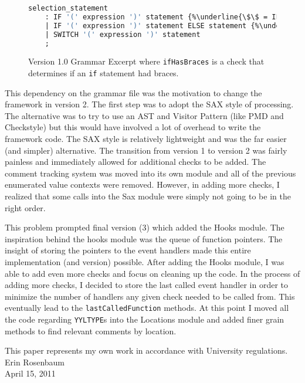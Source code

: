 \documentclass[12pt]{report}
\begin{document}
\begin{figure}
\begin{lstlisting}[language=Caml, escapechar=\%]
selection_statement
	: IF '(' expression ')' statement {%\underline{\$\$ = IF\_SELECTION;}% ifHasBraces($5, @$);}
	| IF '(' expression ')' statement ELSE statement {%\underline{\$\$ = IF\_ELSE\_SELECTION;}% ifHasBraces($5, @$); ifHasBraces($7, @$);}
	| SWITCH '(' expression ')' statement
	;
\end{lstlisting}
\caption[Version 1.0 Grammar Excerpt]{Version 1.0 Grammar Excerpt where \lstinline{ifHasBraces} is a check that determines if an \lstinline{if} statement had braces.}
\label{1.0grammar}
\end{figure}

This dependency on the grammar file was the motivation to change the framework in version 2. The first 
step was to adopt the SAX style of processing. The alternative was to try to use an AST and Visitor 
Pattern (like PMD and Checkstyle) but this would have involved a lot of overhead to write the framework 
code. The SAX style is relatively lightweight and was the far easier (and simpler) alternative. The 
transition from version 1 to version 2 was fairly painless and immediately allowed for additional checks to 
be added. The comment tracking system was moved into its own module and all of the previous 
enumerated value contexts were removed. However, in adding more checks, I realized that some calls 
into the Sax module were simply not going to be in the right order. 

This problem prompted final version (3) which added the Hooks module. The inspiration behind the 
hooks module was the queue of function pointers. The insight of storing the pointers to the event 
handlers made this entire implementation (and version) possible. After adding the Hooks module, I was 
able to add even more checks and focus on cleaning up the code. In the process of adding more checks, 
I decided to store the last called event handler in order to minimize the number of handlers any given 
check needed to be called from. This eventually lead to the \lstinline{lastCalledFunction} methods.  At 
this point I moved all the code regarding \lstinline{YYLTYPE}s into the Locations module and added finer 
grain methods to find relevant comments by location. 

\singlespacing
\nocite{*}

\clearpage
{}
{}



\cleardoublepage
\pagestyle{plain}
\begin{flushright}
\vspace*{1.5in}
This paper represents my own work in accordance with University regulations.\\
\vspace*{.75in}
Erin Rosenbaum\\
April 15, 2011

\end{flushright}
\end{document}
